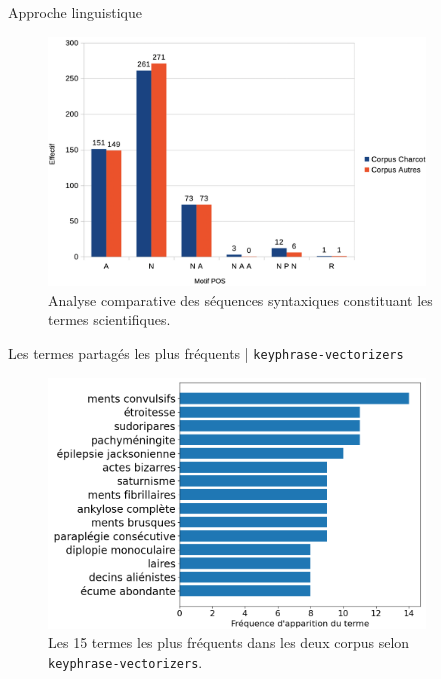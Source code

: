 \begin{frame}{Approche linguistique}
		\begin{figure}[!ht]
		\centering
		\includegraphics[width=100mm,scale=0.5]{pic/repartition_motifs_POS.png}
		\caption{Analyse comparative des séquences syntaxiques constituant les termes scientifiques.}
		\label{fig:enter-label}
	\end{figure}
\end{frame}

\begin{frame}{Les termes partagés les plus fréquents | \texttt{keyphrase-vectorizers}}
	\begin{figure}[!ht]
		\centering
		\includegraphics[width=100mm,scale=0.5]{pic/termes_partages.png}
		\caption{Les 15 termes les plus fréquents dans les deux corpus selon \texttt{keyphrase-vectorizers}.}
		\label{fig:enter-label}
	\end{figure}
\end{frame}



